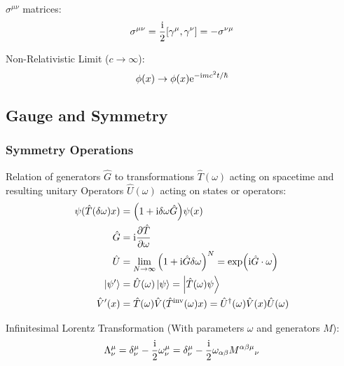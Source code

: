 			\noindent
			$\sigma^{\mu\nu}$ matrices:
			\begin{equation}
				\sigma^{\mu\nu} = \frac{\i}{2}\comm{\gamma^\mu}{\gamma^\nu} = -\sigma^{\nu\mu}
			\end{equation}

			\noindent
			Non-Relativistic Limit ($c\rightarrow\infty$):
			\begin{equation}
				\phi(x) \rightarrow \phi(x) \mathrm{e}^{-\mathrm{i} m c^2 t/\hbar}
			\end{equation}

	\subsection{Gauge and Symmetry}
		\subsubsection{Symmetry Operations}
			Relation of generators $\hat{G}$ to transformations $\hat{T}(\omega)$ acting on spacetime and resulting unitary Operators $\hat{U}(\omega)$ acting on states or operators:
			\begin{equation}
				\begin{aligned}
					\psi(\hat{T}(\delta \omega)x) &= \qty(1+ \mathrm{i} \delta\omega \hat{G}) \psi(x)\\
					\hat{G} &= \mathrm{i} \pdv{\hat{T}}{\omega} \\
					\hat{U} &= \lim_{N\rightarrow \infty} \qty(1+\mathrm{i}\hat{G}\delta\omega)^N = \exp(\mathrm{i} \hat{G} \cdot \omega) \\
					\Ket{\psi'} &= \hat{U}(\omega)\Ket{\psi} = \Ket{\hat{T}(\omega)\psi} \\
					\hat{V}'(x) &= \hat{T}(\omega) \hat{V}({\hat{T}}^\mathrm{inv}(\omega)x) = \hat{U}^\dagger(\omega) \hat{V}(x) \hat{U}(\omega) \\
				\end{aligned}
			\end{equation}
		
			\noindent
			Infinitesimal Lorentz Transformation (With parameters $\omega$ and generators $M$):
			\begin{equation}
				\begin{aligned}
					\Lambda^\mu_\nu &= \delta^\mu_\nu - \frac{\mathrm{i}}{2}\omega^\mu_\nu = \delta^\mu_\nu - \frac{\mathrm{i}}{2}\omega_{\alpha\beta}M^{\alpha\beta\mu}{}_\nu \\
				\end{aligned}
			\end{equation}
		
